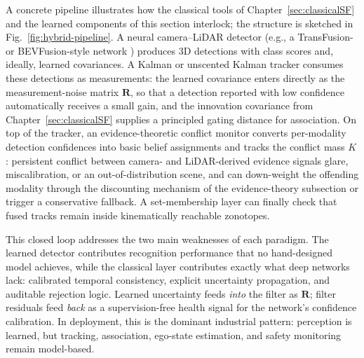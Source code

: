 \documentclass[11pt,oneside,openany]{book}
\begin{document}
{\color{blue}
A concrete pipeline illustrates how the classical tools of Chapter~\ref{sec:classicalSF} and the learned components of this section interlock; the structure is sketched in Fig.~\ref{fig:hybrid-pipeline}. A neural camera--LiDAR detector (e.g., a TransFusion- or BEVFusion-style network \cite{bai2022_transfusion,liu2023_bevfusion}) produces 3D detections with class scores and, ideally, learned covariances. A Kalman or unscented Kalman tracker consumes these detections as measurements: the learned covariance enters directly as the measurement-noise matrix $\mathbf{R}$, so that a detection reported with low confidence automatically receives a small gain, and the innovation covariance from Chapter~\ref{sec:classicalSF} supplies a principled gating distance for association. On top of the tracker, an evidence-theoretic conflict monitor converts per-modality detection confidences into basic belief assignments and tracks the conflict mass $K$: persistent conflict between camera- and LiDAR-derived evidence signals glare, miscalibration, or an out-of-distribution scene, and can down-weight the offending modality through the discounting mechanism of the evidence-theory subsection or trigger a conservative fallback. A set-membership layer can finally check that fused tracks remain inside kinematically reachable zonotopes.

This closed loop addresses the two main weaknesses of each paradigm. The learned detector contributes recognition performance that no hand-designed model achieves, while the classical layer contributes exactly what deep networks lack: calibrated temporal consistency, explicit uncertainty propagation, and auditable rejection logic. Learned uncertainty feeds \emph{into} the filter as $\mathbf{R}$; filter residuals feed \emph{back} as a supervision-free health signal for the network's confidence calibration. In deployment, this is the dominant industrial pattern: perception is learned, but tracking, association, ego-state estimation, and safety monitoring remain model-based.

}
\end{document}

